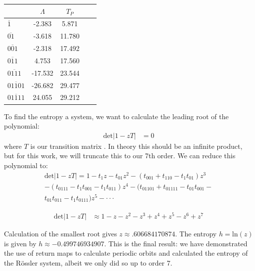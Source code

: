 \documentclass[aip,cha,reprint,
secnumarabic,
nofootinbib, tightenlines,
nobibnotes, showkeys, showpacs,
groupedaddress
]{revtex4-1}
\begin{document}
\begin{center}
  \begin{tabular}{| l | c | c | c  | r| }
    \hline
     & $\Lambda$ & $T_P$ \\ \hline
    $\overline{1}$  & -2.383 & 5.871\\ \hline
    $\overline{01}$ &  -3.618 & 11.780 \\ \hline
    $\overline{001}$ &  -2.318 & 17.492 \\ \hline
    $\overline{011}$ & 4.753 & 17.560  \\ \hline
    $\overline{0111}$ &  -17.532 & 23.544 \\ \hline
    $\overline{01101}$ &  -26.682 & 29.477 \\ \hline
    $\overline{01111}$ & 24.055 & 29.212 \\ \hline
  \end{tabular}
  \label{Tab:Eigenvales}
\end{center}

To find the entropy a system, we want to calculate the leading root of the polynomial:
\begin{equation}
\begin{split}
\text{det}|1-zT| &=0
\end{split}
\end{equation}
where $T$ is our transition matrix \cite{CB}. In theory this should be an infinite product, but for this work, we will truncate this to our 7th order.  We can reduce this polynomial to:
\begin{equation}
\begin{split}
\text{det}|1-zT| = 1 - t_{1}z - t_{01}z^2 - (t_{001} + t_{110} - t_{1}t_{01})z^3 \\ -(t_{0111} -t_{1}t_{001}-t_{1}t_{011})z^4  -(t_{01101}+t_{01111}-t_{01}t_{001}- \\ t_{01}t_{011}-t_{1}t_{0111})z^5 - \cdot \cdot \cdot
\end{split}
\end{equation}

\begin{equation}
\begin{split}
\text{det}|1-zT| &\approx 1 - z -z^2 - z^3 +z^4+z^5-z^6+z^7
\end{split}
\end{equation}

Calculation of the smallest root gives $z \approx .606684170874$.  The entropy $h = \text{ln}(z)$ is given by $h \approx -0.499746934907$.   This is the final result: we have demonstrated the use of return maps to calculate periodic orbits and calculated the entropy of the R\"ossler system, albeit we only did so up to order 7.
\end{document}
